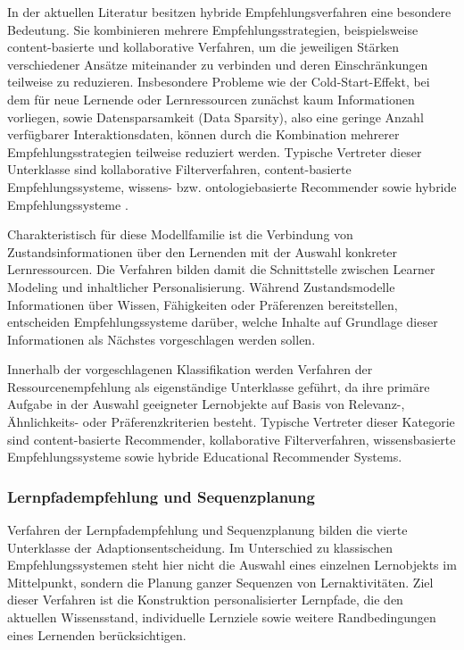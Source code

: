 In der aktuellen Literatur besitzen hybride Empfehlungsverfahren eine
besondere Bedeutung. Sie kombinieren mehrere Empfehlungsstrategien,
beispielsweise content-basierte und kollaborative Verfahren, um die
jeweiligen Stärken verschiedener Ansätze miteinander zu verbinden und
deren Einschränkungen teilweise zu reduzieren. Insbesondere Probleme wie
der Cold-Start-Effekt, bei dem für neue Lernende oder Lernressourcen
zunächst kaum Informationen vorliegen, sowie Datensparsamkeit (Data
Sparsity), also eine geringe Anzahl verfügbarer Interaktionsdaten,
können durch die Kombination mehrerer Empfehlungsstrategien teilweise
reduziert werden. Typische Vertreter dieser Unterklasse sind
kollaborative Filterverfahren, content-basierte Empfehlungssysteme,
wissens- bzw. ontologiebasierte Recommender sowie hybride
Empfehlungssysteme \citep{daSilva2023}.

Charakteristisch für diese Modellfamilie ist die Verbindung von
Zustandsinformationen über den Lernenden mit der Auswahl konkreter
Lernressourcen. Die Verfahren bilden damit die Schnittstelle zwischen
Learner Modeling und inhaltlicher Personalisierung. Während
Zustandsmodelle Informationen über Wissen, Fähigkeiten oder Präferenzen
bereitstellen, entscheiden Empfehlungssysteme darüber, welche Inhalte
auf Grundlage dieser Informationen als Nächstes vorgeschlagen werden
sollen.

Innerhalb der vorgeschlagenen Klassifikation werden Verfahren der
Ressourcenempfehlung als eigenständige Unterklasse geführt, da ihre
primäre Aufgabe in der Auswahl geeigneter Lernobjekte auf Basis von
Relevanz-, Ähnlichkeits- oder Präferenzkriterien besteht. Typische
Vertreter dieser Kategorie sind content-basierte Recommender,
kollaborative Filterverfahren, wissensbasierte Empfehlungssysteme sowie
hybride Educational Recommender Systems.

\subsubsection{Lernpfadempfehlung und
Sequenzplanung}\label{lernpfadempfehlung-und-sequenzplanung}

Verfahren der Lernpfadempfehlung und Sequenzplanung bilden die vierte
Unterklasse der Adaptionsentscheidung. Im Unterschied zu klassischen
Empfehlungssystemen steht hier nicht die Auswahl eines einzelnen
Lernobjekts im Mittelpunkt, sondern die Planung ganzer Sequenzen von
Lernaktivitäten. Ziel dieser Verfahren ist die Konstruktion
personalisierter Lernpfade, die den aktuellen Wissensstand, individuelle
Lernziele sowie weitere Randbedingungen eines Lernenden berücksichtigen.


